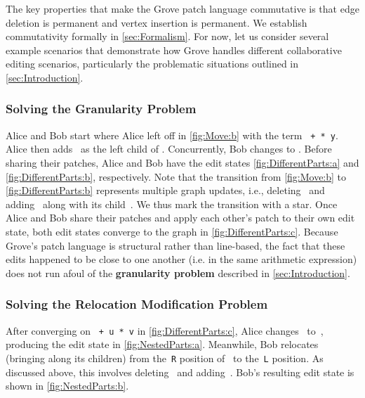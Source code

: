 The key properties that make the Grove patch language commutative is that 
edge deletion is permanent and vertex insertion is permanent.
We establish commutativity formally in \autoref{sec:Formalism}.
For now, let us consider several example scenarios that demonstrate 
how Grove handles different collaborative editing scenarios, particularly 
the problematic situations outlined in \autoref{sec:Introduction}. 

\subsubsection{Solving the Granularity Problem}%
\label{sub:Editing Different Parts of the Code}

Alice and Bob start where Alice left off in \autoref{fig:Move:b} 
with the term \texttt{\hole{} + \hole{} * y}.
Alice then adds~\vDifferentPartsAlice{} as the left child of \vSimpleTimes{}.
Concurrently, Bob changes \vSimpleY{} to \vDifferentPartsBob{}.
Before sharing their patches,
Alice and Bob have the edit states \autoref{fig:DifferentParts:a} and \autoref{fig:DifferentParts:b}, respectively.
Note that the transition from \autoref{fig:Move:b} to \autoref{fig:DifferentParts:b}
represents multiple graph updates,
i.e., deleting~\eSimpleY{} and adding~\eDifferentPartsBob{} along with its child~\vDifferentPartsBob{}.
We thus mark the transition with a star.
Once Alice and Bob share their patches and apply each other's patch to their own edit state,
both edit states converge to the graph in \autoref{fig:DifferentParts:c}. 
Because Grove's patch language is structural rather than line-based, the fact that these edits happened to be close to one another (i.e. in the same arithmetic expression) does not run afoul of the \textbf{granularity problem} described in \autoref{sec:Introduction}.


\subsubsection{Solving the Relocation Modification Problem}%
\label{sub:Editing Nested Parts of the Code}

After converging on \texttt{\hole{} + u * v} in \autoref{fig:DifferentParts:c}, 
Alice changes~\vDifferentPartsAlice{} to~\vNestedPartsAlice{},
producing the edit state in \autoref{fig:NestedParts:a}.
Meanwhile, Bob relocates~\vSimpleTimes{} (bringing along its children)
from the~\texttt{R} position of~\vWrapPlus{} to the~\texttt{L} position. As discussed above, this involves deleting~\eMoveTimes{} and adding~\eNestedPartsBob{}.
Bob's resulting edit state is shown in \autoref{fig:NestedParts:b}.

